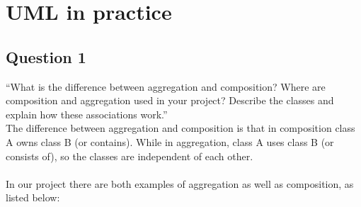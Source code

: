 \chapter{UML in practice}
\section{Question 1}
``What is the difference between aggregation and composition? Where are composition and aggregation
used in your project? Describe the classes and explain how these associations work.''
\\
\noindent The difference between aggregation and composition is that in composition class A owns class B (or contains). While in aggregation, class A uses class B (or consists of), so the classes are independent of each other. 
\\\\
In our project there are both examples of aggregation as well as composition, as listed below:

